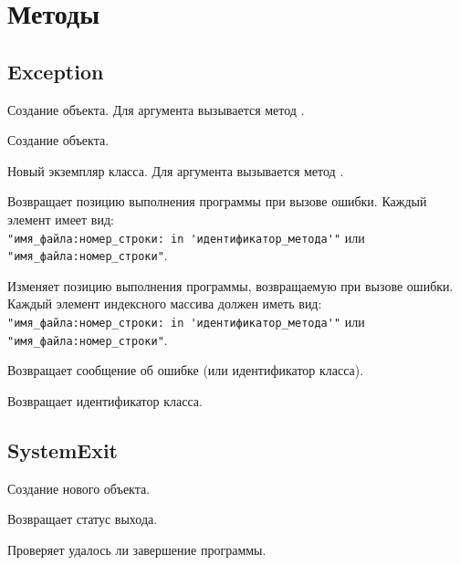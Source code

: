 \section{Методы}

\subsection*{Exception}

\begin{methodlist}
  Создание объекта. Для аргумента вызывается метод .

  Создание объекта. 
 
  Новый экземпляр класса. Для аргумента вызывается метод .

  Возвращает позицию выполнения программы при вызове ошибки. Каждый элемент имеет вид:
  \\\verb!"имя_файла:номер_строки: in 'идентификатор_метода'"!
  или 
  \\\verb!"имя_файла:номер_строки"!. 

  Изменяет позицию выполнения программы, возвращаемую при вызове ошибки. Каждый элемент индексного массива должен иметь вид: 
  \\\verb!"имя_файла:номер_строки: in 'идентификатор_метода'"!
  или 
  \\\verb!"имя_файла:номер_строки"!.

  Возвращает сообщение об ошибке (или идентификатор класса). 
 
  Возвращает идентификатор класса.
\end{methodlist}

\subsection*{SystemExit}

\begin{methodlist}
  Создание нового объекта. 

  Возвращает статус выхода. 
 
  Проверяет удалось ли завершение программы.
\end{methodlist}

